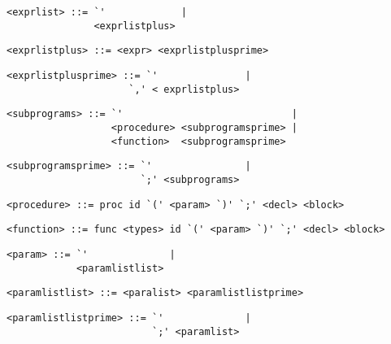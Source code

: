 \begin{footnotesize}
\begin{lstlisting}[frame=single, label={exprlist}, language=pie]
<exprlist> ::= `'             |
               <exprlistplus>
\end{lstlisting}

\begin{lstlisting}[frame=single, label={exprlistplus}, language=pie]
<exprlistplus> ::= <expr> <exprlistplusprime>
\end{lstlisting}

\begin{lstlisting}[frame=single, label={exprlistplusprime}, language=pie]
<exprlistplusprime> ::= `'               |
                     `,' < exprlistplus>
\end{lstlisting}

\begin{lstlisting}[frame=single, label={subprograms}, language=pie]
<subprograms> ::= `'                             |
                  <procedure> <subprogramsprime> |
                  <function>  <subprogramsprime>
\end{lstlisting}

\begin{lstlisting}[frame=single, label={subprogramsprime}, language=pie]
<subprogramsprime> ::= `'                |
                       `;' <subprograms>
\end{lstlisting}

\begin{lstlisting}[frame=single, label={procedure}, language=pie]
<procedure> ::= proc id `(' <param> `)' `;' <decl> <block>
\end{lstlisting}

\begin{lstlisting}[frame=single, label={function}, language=pie]
<function> ::= func <types> id `(' <param> `)' `;' <decl> <block>
\end{lstlisting}

\begin{lstlisting}[frame=single, label={param}, language=pie]
<param> ::= `'              |
            <paramlistlist>
\end{lstlisting}

\begin{lstlisting}[frame=single, label={paramlistlist}, language=pie]
<paramlistlist> ::= <paralist> <paramlistlistprime>
\end{lstlisting}

\begin{lstlisting}[frame=single, label={paramlistlistprime}, language=pie]
<paramlistlistprime> ::= `'              |
                         `;' <paramlist>
\end{lstlisting}


\end{footnotesize}
